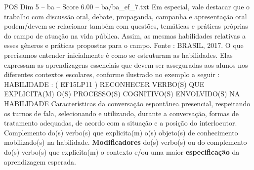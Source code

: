 \begin{textsample}{POS Dim 5 – ba – Score 6.00 – ba/ba\_ef\_7.txt}
Em especial, vale destacar que o trabalho com discussão oral, debate, propaganda, campanha e apresentação oral podem/devem se relacionar também com questões, temáticas e práticas próprias do campo de atuação na vida pública.
Assim, as mesmas habilidades relativas a esses gêneros e práticas propostas para o campo.
Fonte : BRASIL, 2017.
O que precisamos entender inicialmente é como se estruturam as habilidades.
Elas expressam as aprendizagens essenciais que devem ser asseguradas aos alunos nos diferentes contextos escolares, conforme ilustrado no exemplo a seguir : HABILIDADE : ( EF15LP11 ) RECONHECER VERBO(S) QUE EXPLICITA(M) O(S) PROCESSO(S) COGNITIVO(S) ENVOLVIDO(S) NA HABILIDADE Características da conversação espontânea presencial, respeitando os turnos de fala, selecionando e utilizando, durante a conversação, formas de tratamento adequadas, de acordo com a situação e a posição do interlocutor.
Complemento do(s) verbo(s) que explicita(m) o(s) objeto(s) de conhecimento mobilizado(s) na habilidade. \textbf{Modificadores} do(s) verbo(s) ou do complemento do(s) verbo(s) que explicita(m) o contexto e/ou uma maior \textbf{especificação} da aprendizagem esperada.

\end{textsample}
